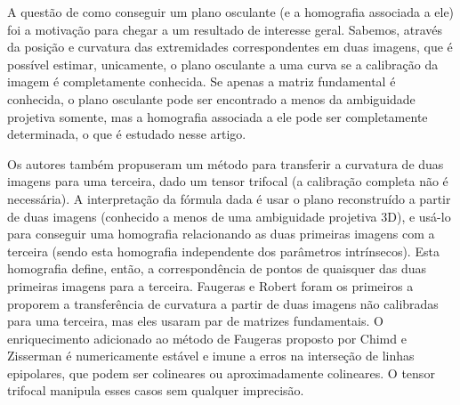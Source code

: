 A questão de como conseguir um plano osculante (e a homografia associada a ele) foi a motivação para chegar a um resultado de interesse geral. Sabemos, através da posição e curvatura das extremidades correspondentes em duas imagens, que é possível estimar, unicamente, o plano osculante a uma curva se a calibração da imagem é completamente conhecida. Se apenas a matriz fundamental é conhecida, o plano osculante pode ser encontrado a menos da ambiguidade projetiva somente, mas a homografia associada a ele pode ser completamente determinada, o que é estudado nesse artigo.


Os autores também propuseram um método para transferir a curvatura de duas imagens para uma terceira, dado um tensor trifocal (a calibração completa não é necessária). A interpretação da fórmula dada é usar o plano reconstruído a partir de duas imagens (conhecido a menos de uma ambiguidade projetiva 3D), e usá-lo para conseguir uma homografia relacionando as duas primeiras imagens com a terceira (sendo esta homografia independente dos parâmetros intrínsecos). Esta homografia define, então, a correspondência de pontos de quaisquer das duas primeiras imagens para a terceira. Faugeras e Robert foram os primeiros a proporem a transferência de curvatura a partir de duas imagens não calibradas para uma terceira, mas eles usaram par de matrizes fundamentais. O enriquecimento adicionado ao método de Faugeras proposto por Chimd e Zisserman é numericamente estável e imune a erros na interseção de linhas epipolares, que podem ser colineares ou aproximadamente colineares. O tensor trifocal manipula esses casos sem qualquer imprecisão.\\


